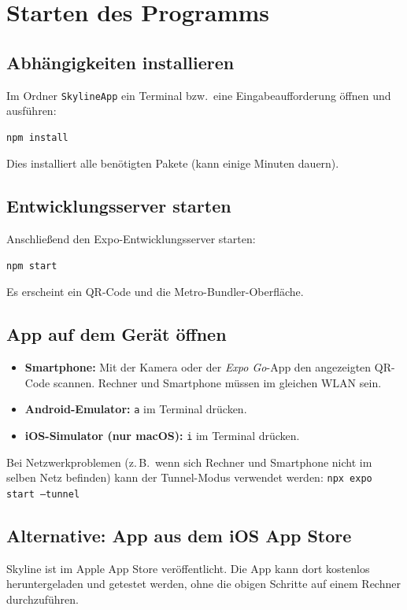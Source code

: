 \section{Starten des Programms}
\subsection{Abhängigkeiten installieren}
Im Ordner \texttt{SkylineApp} ein Terminal bzw.\ eine Eingabeaufforderung öffnen und ausführen:
\begin{lstlisting}[language=sh,basicstyle=\ttfamily\small]
npm install
\end{lstlisting}
Dies installiert alle benötigten Pakete (kann einige Minuten dauern).

\subsection{Entwicklungsserver starten}
Anschließend den Expo-Entwicklungsserver starten:
\begin{lstlisting}[language=sh,basicstyle=\ttfamily\small]
npm start
\end{lstlisting}
Es erscheint ein QR-Code und die Metro-Bundler-Oberfläche.

\subsection{App auf dem Gerät öffnen}
\begin{itemize}
  \item \textbf{Smartphone:} Mit der Kamera oder der \emph{Expo Go}-App den angezeigten QR-Code scannen. Rechner und Smartphone müssen im gleichen WLAN sein.
  \item \textbf{Android-Emulator:} \texttt{a} im Terminal drücken.
  \item \textbf{iOS-Simulator (nur macOS):} \texttt{i} im Terminal drücken.
\end{itemize}

Bei Netzwerkproblemen (z.\,B.\ wenn sich Rechner und Smartphone nicht im selben Netz befinden) kann der Tunnel-Modus verwendet werden: \texttt{npx expo start --tunnel}

\subsection{Alternative: App aus dem iOS App Store}
Skyline ist im Apple App Store veröffentlicht. Die App kann dort kostenlos heruntergeladen und getestet werden, ohne die obigen Schritte auf einem Rechner durchzuführen.
